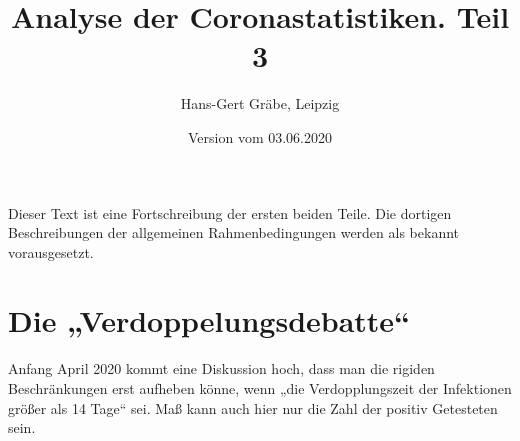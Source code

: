 \documentclass[a4paper,11pt]{article}
\title{Analyse der Coronastatistiken. Teil 3}
\author{Hans-Gert Gräbe, Leipzig}
\date{Version vom 03.06.2020}
\begin{document}
\maketitle

Dieser Text ist eine Fortschreibung der ersten beiden Teile. Die dortigen
Beschreibungen der allgemeinen Rahmenbedingungen werden als bekannt
vorausgesetzt. 

\section{Die „Verdoppelungsdebatte“}

Anfang April 2020 kommt eine Diskussion hoch, dass man die rigiden
Beschränkungen erst aufheben könne, wenn „die Verdopplungszeit der Infektionen
größer als 14 Tage“ sei.  Maß kann auch hier nur die Zahl der positiv
Getesteten sein. 
\end{document}
